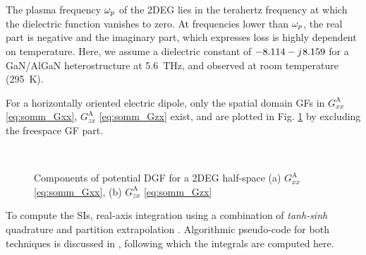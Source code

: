 The plasma frequency $\omega_p$ of the 2DEG lies in the terahertz frequency at which the dielectric function vanishes to zero. At frequencies lower than $\omega_p$, the real part is negative and the imaginary part, which expresses loss is highly dependent on temperature. Here, we assume a dielectric constant of $ -8.114 - {j}\mkern1mu 8.159$ for a GaN/AlGaN heterostructure at \SI{5.6}{\THz}, and observed at room temperature (\SI{295}{\kelvin}).

For a horizontally oriented electric dipole, only the spatial domain GFs in $G_{xx}^\mathrm{A}$ \eqref{eq:somm_Gxx}, $G_{zx}^\mathrm{A}$ \eqref{eq:somm_Gzx} exist, and are plotted in Fig. \ref{fig:G^A_components_halfspace} by excluding the freespace GF part.
%
\begin{figure}[!htbp]
  \centering
  \\
  \caption{Components of potential DGF for a 2DEG half-space (a) $G_{xx}^\mathrm{A}$ \eqref{eq:somm_Gxx}, (b) $G_{zx}^\mathrm{A}$ \eqref{eq:somm_Gzx} }
  \label{fig:G^A_components_halfspace}
\end{figure}
To compute the SIs, real-axis integration using a combination of \emph{tanh-sinh} quadrature \cite{takahasi1974,Golubovic2012,Koufogiannis2015} and partition extrapolation \cite{Michalski1998}. Algorithmic pseudo-code for both techniques is discussed in \cite{Michalski2016}, following which the integrals are computed here.
%
